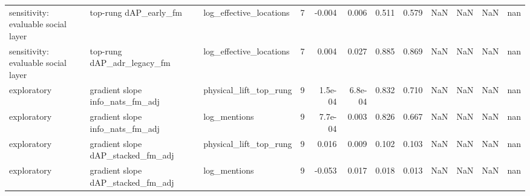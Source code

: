 \begin{tabular}{lllrrrrrrrrl}
sensitivity: evaluable social layer & top-rung dAP\_early\_fm & log\_effective\_locations & 7 & -0.004 & 0.006 & 0.511 & 0.579 & NaN & NaN & NaN & nan \\
sensitivity: evaluable social layer & top-rung dAP\_adr\_legacy\_fm & log\_effective\_locations & 7 & 0.004 & 0.027 & 0.885 & 0.869 & NaN & NaN & NaN & nan \\
exploratory & gradient slope info\_nats\_fm\_adj & physical\_lift\_top\_rung & 9 & 1.5e-04 & 6.8e-04 & 0.832 & 0.710 & NaN & NaN & NaN & nan \\
exploratory & gradient slope info\_nats\_fm\_adj & log\_mentions & 9 & 7.7e-04 & 0.003 & 0.826 & 0.667 & NaN & NaN & NaN & nan \\
exploratory & gradient slope dAP\_stacked\_fm\_adj & physical\_lift\_top\_rung & 9 & 0.016 & 0.009 & 0.102 & 0.103 & NaN & NaN & NaN & nan \\
exploratory & gradient slope dAP\_stacked\_fm\_adj & log\_mentions & 9 & -0.053 & 0.017 & 0.018 & 0.013 & NaN & NaN & NaN & nan \\
\bottomrule
\end{tabular}
